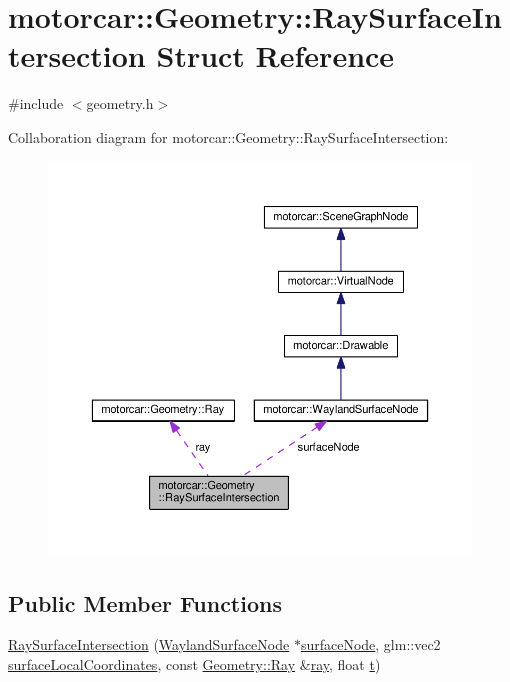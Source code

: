 \hypertarget{structmotorcar_1_1Geometry_1_1RaySurfaceIntersection}{\section{motorcar\-:\-:Geometry\-:\-:Ray\-Surface\-Intersection Struct Reference}
\label{structmotorcar_1_1Geometry_1_1RaySurfaceIntersection}
}


{\ttfamily \#include $<$geometry.\-h$>$}



Collaboration diagram for motorcar\-:\-:Geometry\-:\-:Ray\-Surface\-Intersection\-:
\nopagebreak
\begin{figure}[H]
\begin{center}
\leavevmode
\includegraphics[width=350pt]{structmotorcar_1_1Geometry_1_1RaySurfaceIntersection__coll__graph}
\end{center}
\end{figure}
\subsection*{Public Member Functions}
\begin{DoxyCompactItemize}
\item 
\hyperlink{structmotorcar_1_1Geometry_1_1RaySurfaceIntersection_a25998175e122ecae30e93f823b3b84e4}{Ray\-Surface\-Intersection} (\hyperlink{classmotorcar_1_1WaylandSurfaceNode}{Wayland\-Surface\-Node} $\ast$\hyperlink{structmotorcar_1_1Geometry_1_1RaySurfaceIntersection_aaea662da642316b521721a5dcff0a280}{surface\-Node}, glm\-::vec2 \hyperlink{structmotorcar_1_1Geometry_1_1RaySurfaceIntersection_abb64ad1bdb4385d23970b1c7ecd4afaa}{surface\-Local\-Coordinates}, const \hyperlink{structmotorcar_1_1Geometry_1_1Ray}{Geometry\-::\-Ray} \&\hyperlink{structmotorcar_1_1Geometry_1_1RaySurfaceIntersection_a2e53423ad071c4587aac822ee6aa3de9}{ray}, float \hyperlink{structmotorcar_1_1Geometry_1_1RaySurfaceIntersection_af32545772aead85519b20869fbc34284}{t})
\end{DoxyCompactItemize}

